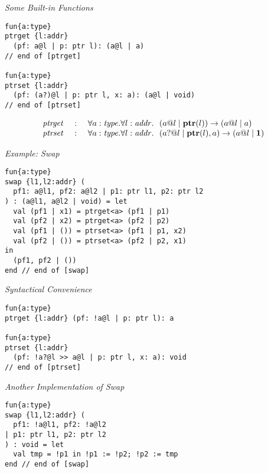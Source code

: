 \documentclass[pdf]{prosper}
\begin{document}
\begin{slide}{\em Some Built-in Functions}
{\blue\begin{verbatim}
fun{a:type}
ptrget {l:addr}
  (pf: a@l | p: ptr l): (a@l | a)
// end of [ptrget]

fun{a:type}
ptrset {l:addr}
  (pf: (a?)@l | p: ptr l, x: a): (a@l | void)
// end of [ptrset]
\end{verbatim}
}
\[\begin{array}{rcl}
{\it ptrget} &~:~& \forall a:{\it type}.\forall l:{\it addr}.~~(a@l \mid \mbox{\bf ptr}(l)) \rightarrow (a@l \mid a) \\
{\it ptrset} &~:~& \forall a:{\it type}.\forall l:{\it addr}.~~(a?@l \mid \mbox{\bf ptr}(l), a)\rightarrow (a@l \mid {\mathbf 1}) \\
\end{array}\]
\end{slide}
\begin{slide}{\em Example: {\it Swap}}
{\blue\begin{verbatim}
fun{a:type}
swap {l1,l2:addr} (
  pf1: a@l1, pf2: a@l2 | p1: ptr l1, p2: ptr l2
) : (a@l1, a@l2 | void) = let
  val (pf1 | x1) = ptrget<a> (pf1 | p1)
  val (pf2 | x2) = ptrget<a> (pf2 | p2)
  val (pf1 | ()) = ptrset<a> (pf1 | p1, x2)
  val (pf2 | ()) = ptrset<a> (pf2 | p2, x1)
in
  (pf1, pf2 | ())
end // end of [swap]
\end{verbatim}
}
\end{slide}
\begin{slide}{\em Syntactical Convenience}
{\blue\begin{verbatim}
fun{a:type}
ptrget {l:addr} (pf: !a@l | p: ptr l): a

fun{a:type}
ptrset {l:addr}
  (pf: !a?@l >> a@l | p: ptr l, x: a): void
// end of [ptrset]
\end{verbatim}
}
\end{slide}
\begin{slide}{\em Another Implementation of {\it Swap}}
{\blue\begin{verbatim}
fun{a:type}
swap {l1,l2:addr} (
  pf1: !a@l1, pf2: !a@l2
| p1: ptr l1, p2: ptr l2
) : void = let
  val tmp = !p1 in !p1 := !p2; !p2 := tmp
end // end of [swap]
\end{verbatim}
}
\end{slide}
\def\varrayView{{\it array\_v}}
\def\cArrayNil{{\it array\_v\_nil}}
\def\cArrayCons{{\it array\_v\_cons}}
\end{document}
